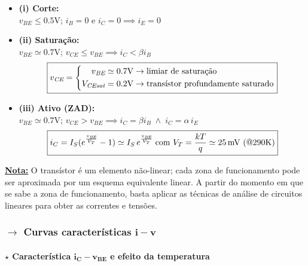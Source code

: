 \begin{mdframed}
    \begin{itemize}[leftmargin=*]
        \item[] \textbf{(i) Corte:} \\
        $v_\textit{BE} \le 0.5$V; $i_B = 0$ e $i_C = 0 \implies i_E = 0$
        
        \item[] \textbf{(ii) Saturação:} \\
        $v_\textit{BE} \simeq 0.7$V; $v_\textit{CE} \le v_\textit{BE} \implies i_C < \beta i_B$
        $$
        \boxed{%
            v_\textit{CE} =
            \left\{\begin{aligned}
                v_\textit{BE} \simeq 0.7\text{V} &\rightarrow \text{limiar de saturação}\\
                V_\textit{CEsat} = 0.2\text{V} &\rightarrow \text{transístor profundamente saturado}
            \end{aligned}\right.
        }
        $$
        
        \item[] \textbf{(iii) Ativo (ZAD):} \\
        $v_\textit{BE} \simeq 0.7$V; $v_\textit{CE} > v_\textit{BE} \implies i_C = \beta i_B \;\land\; i_C = \alpha\, i_E$
        $$
        \boxed{%
            i_C = I_S(e^{\frac{v_\textit{BE}}{V_T}} - 1) \simeq I_S\, e^{\frac{v_\textit{BE}}{V_T}} \;\text{com } V_T = \frac{kT}{q} \simeq 25\,\text{mV ($@290$K)} 
        }
        $$
    \end{itemize}
\end{mdframed}

\noindent \underline{\textbf{Nota:}} O transístor é um elemento não-linear; cada zona de funcionamento pode ser aproximada por um esquema equivalente linear. A partir do momento em que se sabe a zona de funcionamento, basta aplicar as técnicas de análise de circuitos lineares para obter as correntes e tensões.

\newpage
\subsubsection[3.1.2 Curvas características i-v]{$\pmb{\rightarrow}$ Curvas características $\mathbf{i-v}$}
\vspace{-0.5em}
\paragraph[3.1.2.1 Característica iC-vBE e efeito da temperatura]{$\pmb{\star}$ Característica $\mathbf{i_C-v_{BE}}$ e efeito da temperatura}\mbox{}

